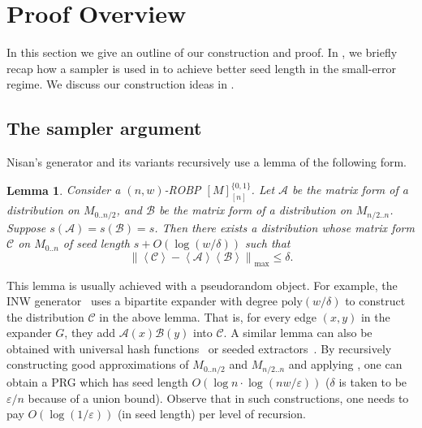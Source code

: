 \documentclass[10pt,a4paper]{article}
\newtheorem{lemma}[theorem]{Lemma}
\newcommand{\inp}[1]{\left\langle#1\right\rangle}
\newcommand{\norm}[2][]{\left\|#2\right\|_{#1}}
\newcommand{\cA}{\mathcal A}
\newcommand{\cB}{\mathcal B}
\newcommand{\cC}{\mathcal C}
\newcommand{\bit}{\{0,1\}}
\newcommand{\eps}{\varepsilon}
\newcommand{\poly}{\mathrm{poly}}
\newcommand{\nmax}{\norm[\mathrm{max}]}
\begin{document}
\section{Proof Overview}\label{sec:proof-overview}
In this section we give an outline of our construction and proof. In , we briefly recap how a sampler is used in \cite{BCG18} to achieve better seed length in the small-error regime. We discuss our construction ideas in . 
\subsection{The sampler argument}\label{sec:samp-arg}
 Nisan's generator and its variants recursively use a lemma of the following form.
\begin{lemma}\label{lemma:INW}
Consider a $(n,w)$-ROBP $[M]_{[n]}^{\bit}$. Let $\cA$ be the matrix form of a distribution on $M_{0..n/2}$, and $\cB$ be the matrix form of a distribution on $M_{n/2..n}$. Suppose $s(\cA)=s(\cB)=s$. Then there exists a distribution whose matrix form $\cC$ on $M_{0..n}$ of seed length $s+O(\log(w/\delta))$ such that
$$\nmax{\inp{\cC}-\inp{\cA}\inp{\cB}}\le \delta.$$
\end{lemma}
This lemma is usually achieved with a pseudorandom object. For example, the INW generator~\cite{INW94} uses a bipartite expander with degree $\poly(w/\delta)$ to construct the distribution $\cC$ in the above lemma. That is, for every edge $(x,y)$ in the expander $G$, they  add $\cA(x)\cB(y)$ into $\cC$. A similar lemma can also be obtained with universal hash functions~\cite{Nis92} or seeded extractors~\cite{RR99}. By recursively constructing good approximations of $M_{0..n/2}$ and $M_{n/2..n}$ and applying , one can obtain a PRG which has seed length $O(\log n\cdot\log(nw/\eps))$ ($\delta$ is taken to be $\eps/n$ because of a union bound). Observe that in such constructions, one needs to pay $O(\log(1/\eps))$ (in seed length) per level of recursion. 
\end{document}
